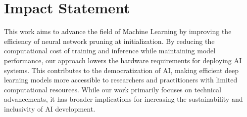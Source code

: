 \newpage
\section*{Impact Statement}

This work aims to advance the field of Machine Learning by improving the efficiency of neural network pruning at initialization. By reducing the computational cost of training and inference while maintaining model performance, our approach lowers the hardware requirements for deploying AI systems. This contributes to the democratization of AI, making efficient deep learning models more accessible to researchers and practitioners with limited computational resources. While our work primarily focuses on technical advancements, it has broader implications for increasing the sustainability and inclusivity of AI development.


